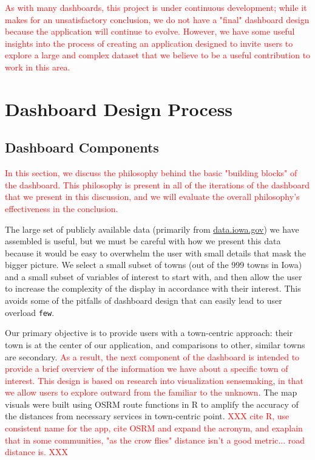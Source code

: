 \documentclass[letterpaper,inpress]{jdsart}
\begin{document}
{\textcolor{red}{As with many dashboards, this project is under continuous development; while it makes for an unsatisfactory conclusion, we do not have a "final" dashboard design because the application will continue to evolve. However, we have some useful insights into the process of creating an application designed to invite users to explore a large and complex dataset that we believe to be a useful contribution to work in this area.}}

\hypertarget{dashboard-design-process}{%
\section{Dashboard Design Process}\label{dashboard-design-process}}

\hypertarget{dashboard-components}{%
\subsection{Dashboard Components}\label{dashboard-components}}

{\textcolor{red}{In this section, we discuss the philosophy behind the basic "building blocks" of the dashboard. This philosophy is present in all of the iterations of the dashboard that we present in this discussion, and we will evaluate the overall philosophy's effectiveness in the conclusion.}}

The large set of publicly available data (primarily from \url{data.iowa.gov}) we have assembled is useful, but we must be careful with how we present this data because it would be easy to overwhelm the user with small details that mask the bigger picture. We select a small subset of towns (out of the 999 towns in Iowa) and a small subset of variables of interest to start with, and then allow the user to increase the complexity of the display in accordance with their interest. This avoids some of the pitfalls of dashboard design that can easily lead to user overload \texttt{few}.

Our primary objective is to provide users with a town-centric approach: their town is at the center of our application, and comparisons to other, similar towns are secondary. {\textcolor{red}{As a result, the next component of the dashboard is intended to provide a brief overview of the information we have about a specific town of interest.}} {\textcolor{red}{This design is based on research into visualization sensemaking}}\citep{lee}, {\textcolor{red}{in that we allow users to explore outward from the familiar to the unknown}}. The map visuals were built using OSRM route functions in R to amplify the accuracy of the distances from necessary services in town-centric point.
{\textcolor{red}{XXX cite R, use consistent name for the app, cite OSRM and expand the acronym, and exaplain that in some communities, "as the crow flies" distance isn't a good metric... road distance is. XXX}}
\end{document}
